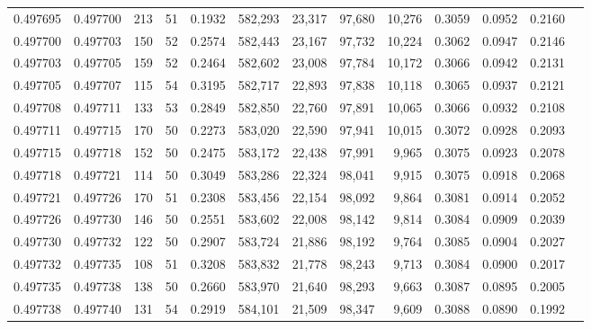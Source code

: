 \begin{tabular}{rrrrrrrrrrrrr}
0.497695 & 0.497700 &   213 &  51 &                                     0.1932 & 582,293 &  23,317 &  97,680 &  10,276 & 0.3059 & 0.0952 & 0.2160 \\
0.497700 & 0.497703 &   150 &  52 &                                     0.2574 & 582,443 &  23,167 &  97,732 &  10,224 & 0.3062 & 0.0947 & 0.2146 \\
0.497703 & 0.497705 &   159 &  52 &                                     0.2464 & 582,602 &  23,008 &  97,784 &  10,172 & 0.3066 & 0.0942 & 0.2131 \\
0.497705 & 0.497707 &   115 &  54 &                                     0.3195 & 582,717 &  22,893 &  97,838 &  10,118 & 0.3065 & 0.0937 & 0.2121 \\
0.497708 & 0.497711 &   133 &  53 &                                     0.2849 & 582,850 &  22,760 &  97,891 &  10,065 & 0.3066 & 0.0932 & 0.2108 \\
0.497711 & 0.497715 &   170 &  50 &                                     0.2273 & 583,020 &  22,590 &  97,941 &  10,015 & 0.3072 & 0.0928 & 0.2093 \\
0.497715 & 0.497718 &   152 &  50 &                                     0.2475 & 583,172 &  22,438 &  97,991 &   9,965 & 0.3075 & 0.0923 & 0.2078 \\
0.497718 & 0.497721 &   114 &  50 &                                     0.3049 & 583,286 &  22,324 &  98,041 &   9,915 & 0.3075 & 0.0918 & 0.2068 \\
0.497721 & 0.497726 &   170 &  51 &                                     0.2308 & 583,456 &  22,154 &  98,092 &   9,864 & 0.3081 & 0.0914 & 0.2052 \\
0.497726 & 0.497730 &   146 &  50 &                                     0.2551 & 583,602 &  22,008 &  98,142 &   9,814 & 0.3084 & 0.0909 & 0.2039 \\
0.497730 & 0.497732 &   122 &  50 &                                     0.2907 & 583,724 &  21,886 &  98,192 &   9,764 & 0.3085 & 0.0904 & 0.2027 \\
0.497732 & 0.497735 &   108 &  51 &                                     0.3208 & 583,832 &  21,778 &  98,243 &   9,713 & 0.3084 & 0.0900 & 0.2017 \\
0.497735 & 0.497738 &   138 &  50 &                                     0.2660 & 583,970 &  21,640 &  98,293 &   9,663 & 0.3087 & 0.0895 & 0.2005 \\
0.497738 & 0.497740 &   131 &  54 &                                     0.2919 & 584,101 &  21,509 &  98,347 &   9,609 & 0.3088 & 0.0890 & 0.1992 \\

\end{tabular}
